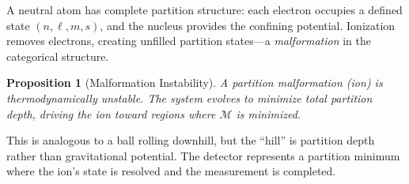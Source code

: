 \documentclass[twocolumn,10pt,a4paper]{article}
\newtheorem{proposition}[theorem]{Proposition}
\theoremstyle{definition}
\theoremstyle{remark}
\newcommand{\Mdepth}{\mathcal{M}}
\begin{document}
A neutral atom has complete partition structure: each electron occupies a defined state $(n, \ell, m, s)$, and the nucleus provides the confining potential. Ionization removes electrons, creating unfilled partition states---a \emph{malformation} in the categorical structure.

\begin{proposition}[Malformation Instability]
\label{prop:malformation}
A partition malformation (ion) is thermodynamically unstable. The system evolves to minimize total partition depth, driving the ion toward regions where $\Mdepth$ is minimized.
\end{proposition}

This is analogous to a ball rolling downhill, but the ``hill'' is partition depth rather than gravitational potential. The detector represents a partition minimum where the ion's state is resolved and the measurement is completed.
\end{document}
